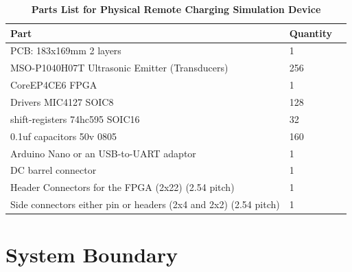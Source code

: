\documentclass[12pt, titlepage]{article}
\begin{document}
\begin{table}[H]
  \caption{\bf Parts List for Physical Remote Charging Simulation Device}
  \begin{tabular}{ |p{4cm}|p{3cm}|p{7cm}|} 
   \hline
  \bf Part & \bf Quantity\\
   \hline
   PCB: 183x169mm 2 layers & 1\\
   \hline
   MSO-P1040H07T Ultrasonic Emitter (Transducers) & 256\\
   \hline 
   CoreEP4CE6 FPGA & 1\\
   \hline 
   Drivers MIC4127 SOIC8 & 128\\
   \hline 
   shift-registers 74hc595 SOIC16 & 32\\
   \hline 
   0.1uf capacitors 50v 0805 & 160\\
   \hline 
   Arduino Nano or an USB-to-UART adaptor & 1\\
   \hline 
   DC barrel connector & 1\\
   \hline 
   Header Connectors for the FPGA (2x22) (2.54 pitch) & 1\\
   \hline 
   Side connectors either pin or headers (2x4 and 2x2) (2.54 pitch) & 1\\

  \end{tabular}
  \end{table}

\section{System Boundary}
\end{document}
